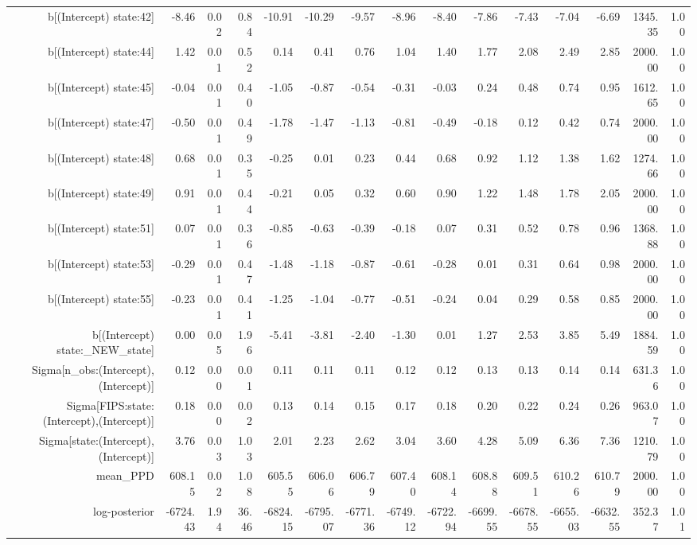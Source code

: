 \begin{table}[ht]
\begin{tabular}{rrrrrrrrrrrrrrr}
  b[(Intercept) state:42] & -8.46 & 0.02 & 0.84 & -10.91 & -10.29 & -9.57 & -8.96 & -8.40 & -7.86 & -7.43 & -7.04 & -6.69 & 1345.35 & 1.00 \\ 
  b[(Intercept) state:44] & 1.42 & 0.01 & 0.52 & 0.14 & 0.41 & 0.76 & 1.04 & 1.40 & 1.77 & 2.08 & 2.49 & 2.85 & 2000.00 & 1.00 \\ 
  b[(Intercept) state:45] & -0.04 & 0.01 & 0.40 & -1.05 & -0.87 & -0.54 & -0.31 & -0.03 & 0.24 & 0.48 & 0.74 & 0.95 & 1612.65 & 1.00 \\ 
  b[(Intercept) state:47] & -0.50 & 0.01 & 0.49 & -1.78 & -1.47 & -1.13 & -0.81 & -0.49 & -0.18 & 0.12 & 0.42 & 0.74 & 2000.00 & 1.00 \\ 
  b[(Intercept) state:48] & 0.68 & 0.01 & 0.35 & -0.25 & 0.01 & 0.23 & 0.44 & 0.68 & 0.92 & 1.12 & 1.38 & 1.62 & 1274.66 & 1.00 \\ 
  b[(Intercept) state:49] & 0.91 & 0.01 & 0.44 & -0.21 & 0.05 & 0.32 & 0.60 & 0.90 & 1.22 & 1.48 & 1.78 & 2.05 & 2000.00 & 1.00 \\ 
  b[(Intercept) state:51] & 0.07 & 0.01 & 0.36 & -0.85 & -0.63 & -0.39 & -0.18 & 0.07 & 0.31 & 0.52 & 0.78 & 0.96 & 1368.88 & 1.00 \\ 
  b[(Intercept) state:53] & -0.29 & 0.01 & 0.47 & -1.48 & -1.18 & -0.87 & -0.61 & -0.28 & 0.01 & 0.31 & 0.64 & 0.98 & 2000.00 & 1.00 \\ 
  b[(Intercept) state:55] & -0.23 & 0.01 & 0.41 & -1.25 & -1.04 & -0.77 & -0.51 & -0.24 & 0.04 & 0.29 & 0.58 & 0.85 & 2000.00 & 1.00 \\ 
  b[(Intercept) state:\_NEW\_state] & 0.00 & 0.05 & 1.96 & -5.41 & -3.81 & -2.40 & -1.30 & 0.01 & 1.27 & 2.53 & 3.85 & 5.49 & 1884.59 & 1.00 \\ 
  Sigma[n\_obs:(Intercept),(Intercept)] & 0.12 & 0.00 & 0.01 & 0.11 & 0.11 & 0.11 & 0.12 & 0.12 & 0.13 & 0.13 & 0.14 & 0.14 & 631.36 & 1.00 \\ 
  Sigma[FIPS:state:(Intercept),(Intercept)] & 0.18 & 0.00 & 0.02 & 0.13 & 0.14 & 0.15 & 0.17 & 0.18 & 0.20 & 0.22 & 0.24 & 0.26 & 963.07 & 1.00 \\ 
  Sigma[state:(Intercept),(Intercept)] & 3.76 & 0.03 & 1.03 & 2.01 & 2.23 & 2.62 & 3.04 & 3.60 & 4.28 & 5.09 & 6.36 & 7.36 & 1210.79 & 1.00 \\ 
  mean\_PPD & 608.15 & 0.02 & 1.08 & 605.55 & 606.06 & 606.79 & 607.40 & 608.14 & 608.88 & 609.51 & 610.26 & 610.79 & 2000.00 & 1.00 \\ 
  log-posterior & -6724.43 & 1.94 & 36.46 & -6824.15 & -6795.07 & -6771.36 & -6749.12 & -6722.94 & -6699.55 & -6678.55 & -6655.03 & -6632.55 & 352.37 & 1.01 \\ 
   \hline
\end{tabular}
\end{table}
